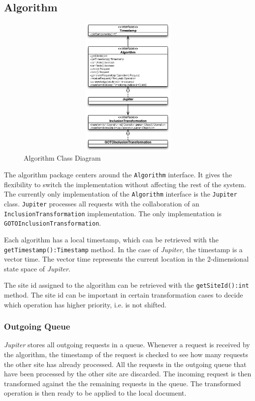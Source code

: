 \subsection{Algorithm}

\begin{figure}[H]
\centering
\includegraphics[height=6.87cm,width=12.09cm]{../images/finalreport/algorithm.eps}
\caption{Algorithm Class Diagram}
\label{fig:algorithm.uml}
\end{figure}

The algorithm package centers around the \texttt{Algorithm} interface.
It gives the flexibility to switch the implementation without affecting the 
rest of the system. The currently only implementation of the \texttt{Algorithm} 
interface is the \texttt{Jupiter} class. \texttt{Jupiter} processes 
all requests with the collaboration of an \texttt{InclusionTransformation}
implementation. The only implementation is \texttt{GOTOInclusionTransformation}.

Each algorithm has a local timestamp, which can be retrieved with the
\texttt{getTimestamp():Timestamp} method. In the 
case of \emph{Jupiter}, the timestamp is a vector time. The vector 
time represents the current location in the 2-dimensional state space of 
\emph{Jupiter}. 

The site id assigned to the algorithm can be retrieved with the
\texttt{getSiteId():int} method. The site id can be important in certain
transformation cases to decide which operation has higher priority, i.e.
is not shifted.

\subsubsection{Outgoing Queue}
\emph{Jupiter} stores all outgoing requests in a queue. Whenever a request
is received by the algorithm, the timestamp of the request is checked to
see how many requests the other site has already processed. All the requests
in the outgoing queue that have been processed by the other site are discarded.
The incoming request is then transformed against the the remaining requests
in the queue. The transformed operation is then ready to be applied to the
local document.

